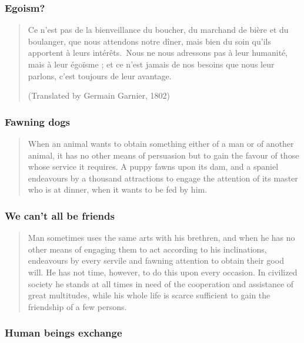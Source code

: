         \subsubsection{Egoism?}

            \begin{quote}
                Ce n’est pas de la bienveillance du boucher, du marchand de bière et du boulanger, que nous attendons notre dîner, mais bien du soin qu’ils apportent à leurs intérêts. Nous ne nous adressons pas à leur humanité, mais à leur égoïsme ; et ce n’est jamais de nos besoins que nous leur parlons, c’est toujours de leur avantage.

                (Translated by Germain Garnier, 1802)
            \end{quote}     

        \subsubsection{Fawning dogs}

            \begin{quote}
                When an animal wants to obtain something either of a man or of another animal, it has no other means of persuasion but to gain the favour of those whose service it requires. A puppy fawns upon its dam, and a spaniel endeavours by a thousand attractions to engage the attention of its master who is at dinner, when it wants to be fed by him.
            \end{quote}

        \subsubsection{We can’t all be friends}

            \begin{quote}
                Man sometimes uses the same arts with his brethren, and when he has no other means of engaging them to act according to his inclinations, endeavours by every servile and fawning attention to obtain their good will. He has not time, however, to do this upon every occasion. In civilized society he stands at all times in need of the cooperation and assistance of great multitudes, while his whole life is scarce sufficient to gain the friendship of a few persons.
            \end{quote}

        \subsubsection{Human beings exchange}

